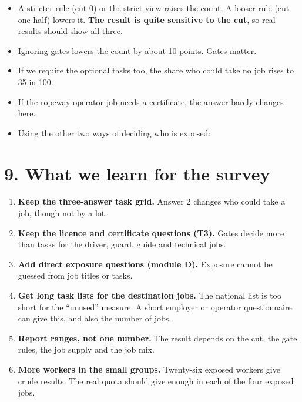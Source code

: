 \documentclass[11pt]{article}
\begin{document}
\begin{itemize}[leftmargin=1.2em,itemsep=2pt]
\item A stricter rule (cut 0) or the strict view raises the count. A looser rule (cut one-half) lowers it. \textbf{The result is quite sensitive to the cut}, so real results should show all three.
\item Ignoring gates lowers the count by about 10 points. Gates matter.
\item If we require the optional tasks too, the share who could take no job rises to 35 in 100.
\item If the ropeway operator job needs a certificate, the answer barely changes here.
\item Using the other two ways of deciding who is exposed:
\end{itemize}

\section*{9. What we learn for the survey}
\begin{enumerate}[leftmargin=1.4em,itemsep=2pt]
\item \textbf{Keep the three-answer task grid.} Answer 2 changes who could take a job, though not by a lot.
\item \textbf{Keep the licence and certificate questions (T3).} Gates decide more than tasks for the driver, guard, guide and technical jobs.
\item \textbf{Add direct exposure questions (module D).} Exposure cannot be guessed from job titles or tasks.
\item \textbf{Get long task lists for the destination jobs.} The national list is too short for the ``unused'' measure. A short employer or operator questionnaire can give this, and also the number of jobs.
\item \textbf{Report ranges, not one number.} The result depends on the cut, the gate rules, the job supply and the job mix.
\item \textbf{More workers in the small groups.} Twenty-six exposed workers give crude results. The real quota should give enough in each of the four exposed jobs.
\end{enumerate}
\end{document}
